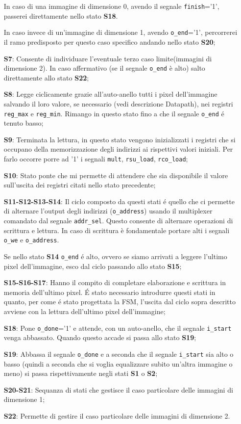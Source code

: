 \begin{itemize}
    In caso di una immagine di dimensione 0, avendo il segnale \texttt{finish}='1', passerei direttamente nello stato \textbf{S18}. 
    
    In caso invece di un'immagine di dimensione 1, avendo \texttt{o\_end}='1', percorrerei il ramo predisposto per questo caso specifico andando nello stato \textbf{S20};
    \item[\textbf{S7}:]Consente di individuare l'eventuale terzo caso limite(immagini di dimensione 2). In caso affermativo (se il segnale \texttt{o\_end} è alto) salto direttamente allo stato \textbf{S22};
    \item[\textbf{S8}:]Legge ciclicamente grazie all'auto-anello tutti i pixel dell'immagine salvando il loro valore, se necessario (vedi descrizione Datapath), nei registri \texttt{reg\_max} e \texttt{reg\_min}. Rimango in questo stato fino a che il segnale \texttt{o\_end} é tenuto basso;  
    \item[\textbf{S9}:]Terminata la lettura, in questo stato vengono inizializzati i registri che si occupano della memorizzazione degli indirizzi ai rispettivi valori iniziali. Per farlo occorre porre ad '1' i segnali \texttt{mult}, \texttt{rsu\_load}, \texttt{rco\_load};
    \item[\textbf{S10}:]Stato ponte che mi permette di attendere che sia disponibile il valore sull'uscita dei registri citati nello stato precedente;
    \item[\textbf{S11-S12-S13-S14}:] Il ciclo composto da questi stati é quello che ci permette di alternare l'output degli indirizzi (\texttt{o\_address}) usando il multiplexer comandato dal segnale \texttt{addr\_sel}. 
    Questo consente di alternare operazioni di scrittura e lettura.
    In caso di scrittura è fondamentale portare alti i segnali \texttt{o\_we} e \texttt{o\_address}.
    
    Se nello stato \textbf{S14} \texttt{o\_end} é alto, ovvero se siamo arrivati a leggere l'ultimo pixel dell'immagine, esco dal ciclo passando allo stato \textbf{S15};
    \item[\textbf{S15-S16-S17}:]Hanno il compito di completare elaborazione e scrittura in memoria dell'ultimo pixel. É stato necessario introdurre questi stati in quanto, per come é stato progettata la FSM, l'uscita dal ciclo sopra descritto avviene con la lettura dell'ultimo pixel dell'immagine;
    \item[\textbf{S18}:]Pone \texttt{o\_done}='1' e attende, con un auto-anello, che il segnale \texttt{i\_start} venga abbassato. Quando questo accade si passa allo stato \textbf{S19};   
    \item[\textbf{S19}:]Abbassa il segnale \texttt{o\_done} e a seconda che il segnale \texttt{i\_start} sia alto o basso (quindi a seconda che si voglia equalizzare subito un'altra immagine o meno) si passa rispettivamente negli stati \textbf{S1} o \textbf{S2};    
    \item[\textbf{S20-S21}:]Sequanza di stati che gestisce il caso particolare delle immagini di dimensione 1; 
    \item[\textbf{S22}:]Permette di gestire il caso particolare delle immagini di dimensione 2. 
\end{itemize}



\clearpage
